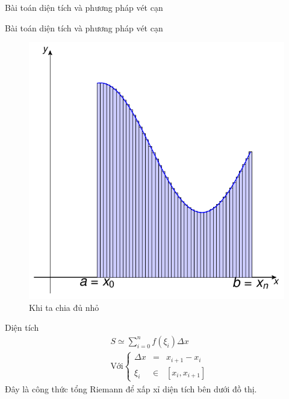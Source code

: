 \begin{frame}{Bài toán diện tích và phương pháp vét cạn}
\begin{center}
\begin{minipage}{0.45\linewidth}
\begin{figure}
            \label{fig:Int_3}
        \end{figure}   
    \end{minipage}
\end{center}

\end{frame}
\begin{frame}{Bài toán diện tích và phương pháp vét cạn}
    \begin{center}
        \begin{minipage}{0.4\linewidth}
        \begin{figure}
            \centering
            \includegraphics[width=1\linewidth]{Figures/Int_4.pdf}
            \caption{Khi ta chia đủ nhỏ}
            \label{fig:Int_4}
        \end{figure}
        \end{minipage}
        \hspace{1mm}
        \begin{minipage}{0.4\linewidth}
            Diện tích 
            \begin{equation}
            \label{eq:int_2}
            \begin{split}
                &S \simeq  \sum_{i=0}^n f(\xi_i) \Delta x \\
                &\text{Với}
                \left\{
                \begin{array}{ccc}
                \Delta x &=& x_{i+1} - x_i \\
                \xi_i &\in& [x_i,x_{i+1}]
                \end{array}
                \right.
            \end{split}
            \end{equation}  
            Đây là công thức tổng Riemann để xấp xỉ diện tích bên dưới đồ thị.
        \end{minipage}
    \end{center}
\end{frame}

